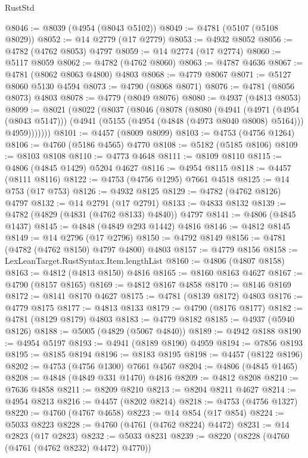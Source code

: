 \begin{lexlean}{RustStd}
\begin{coremodule}
@8046 := @8039 (@4954 (@8043 @5102))
@8049 := @4781 (@5107 (@5108 @8029))
@8052 := @14 @2779 (@17 @2779)
@8053 := @4932 @8052
@8056 := @4782 (@4762 @8053) @4797
@8059 := @14 @2774 (@17 @2774)
@8060 := @5117 @8059
@8062 := @4782 (@4762 @8060)
@8063 := @4787 @4636
@8067 := @4781 (@8062 @8063 @4800) @4803
@8068 := @4779 @8067
@8071 := @5127 @8060 @5130 @4594
@8073 := @4790 (@8068 @8071)
@8076 := @4781 (@8056 @8073) @4803
@8078 := @4779 (@8049 @8076)
@8080 := @4937 (@4813 @8053)
@8099 := @8021
    (@8022
      (@8037
        (@8046
          (@8078
            (@8080
              (@4941
                (@4971 (@4954 (@8043 @5147)))
                (@4941 (@5155 (@4954 (@4848 (@4973 @8040 @8008) @5164))) @4959)))))))
@8101 := @4457 (@8009 @8099)
@8103 := @4753 (@4756 @1264)
@8106 := @4760 (@5186 @4565) @4770
@8108 := @5182 (@5185 @8106)
@8109 := @8103 @8108
@8110 := @4773 @4648
@8111 := @8109 @8110
@8115 := @4806 (@4845 @1429) @5204 @4627
@8116 := @4954 @8115
@8118 := @4457 (@8111 @8116)
@8122 := @4753 (@4756 @1295) @7661 @4518
@8125 := @14 @753 (@17 @753)
@8126 := @4932 @8125
@8129 := @4782 (@4762 @8126) @4797
@8132 := @14 @2791 (@17 @2791)
@8133 := @4833 @8132
@8139 := @4782 (@4829 (@4831 (@4762 @8133) @4840)) @4797
@8141 := @4806 (@4845 @1437)
@8145 := @4848 (@4849 @293 @1442) @4816
@8146 := @4812 @8145
@8149 := @14 @2796 (@17 @2796)
@8150 := @4792 @8149
@8156 := @4781 (@4782 (@4762 @8150) @4797 @4800) @4803
@8157 := @4779 @8156
@8158 := LexLeanTarget.RustSyntax.Item.lengthList
@8160 := @4806 (@4807 @8158)
@8163 := @4812 (@4813 @8150) @4816
@8165 := @8160 @8163 @4627
@8167 := @4790 (@8157 @8165)
@8169 := @4812 @8167 @4858
@8170 := @8146 @8169
@8172 := @8141 @8170 @4627
@8175 := @4781 (@8139 @8172) @4803
@8176 := @4779 @8175
@8177 := @4813 @8133
@8179 := @4790 (@8176 @8177)
@8182 := @4781 (@8129 @8179) @4803
@8183 := @4779 @8182
@8185 := @4937 (@5940 @8126)
@8188 := @5005 (@4829 (@5067 @4840))
@8189 := @4942 @8188
@8190 := @4954 @5197
@8193 := @4941 (@8189 @8190) @4959
@8194 := @7856 @8193
@8195 := @8185 @8194
@8196 := @8183 @8195
@8198 := @4457 (@8122 @8196)
@8202 := @4753 (@4756 @1300) @7661 @4567
@8204 := @4806 (@4845 @1465)
@8208 := @4848 (@4849 @331 @1470) @4816
@8209 := @4812 @8208
@8210 := @7636 @4858
@8211 := @8209 @8210
@8213 := @8204 @8211 @4627
@8214 := @4954 @8213
@8216 := @4457 (@8202 @8214)
@8218 := @4753 (@4756 @1327)
@8220 := @4760 (@4767 @4658)
@8223 := @14 @854 (@17 @854)
@8224 := @5033 @8223
@8228 := @4760 (@4761 (@4762 @8224) @4472)
@8231 := @14 @2823 (@17 @2823)
@8232 := @5033 @8231
@8239 := @8220 (@8228 (@4760 (@4761 (@4762 @8232) @4472) @4770))

\end{coremodule}
\end{lexlean}
